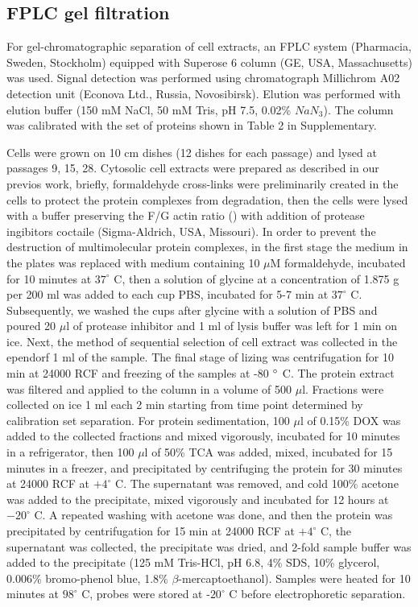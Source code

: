 \documentclass[alpha-refs]{wiley-article}
\begin{document}
\subsection{FPLC gel filtration}

For gel-chromatographic separation of cell extracts, an FPLC system (Pharmacia, Sweden, Stockholm) equipped with Superose 6 column (GE, USA, Massachusetts) was used.
Signal detection was performed using chromatograph Millichrom A02 detection unit (Econova Ltd., Russia, Novosibirsk).
Elution was performed with elution buffer (150 mM NaCl, 50 mM Tris, pH 7.5, 0.02\% $NaN_3$).
The column was calibrated with the set of proteins shown in Table 2 in Supplementary.

Cells were grown on 10 cm dishes (12 dishes for each passage) and lysed at passages 9, 15, 28.
Cytosolic cell extracts were prepared as described in our previos work, briefly, formaldehyde cross-links were preliminarily created in the cells to protect the protein complexes from degradation, then the cells were lysed with a buffer preserving the F/G actin ratio (\cite{bobkov2017effect}) with addition of protease ingibitors coctaile (Sigma-Aldrich, USA, Missouri).
In order to prevent the destruction of multimolecular protein complexes, in the first stage the medium in the plates was replaced with medium containing 10 $\mu$M formaldehyde, incubated for 10 minutes at $37^{\circ}$ C, then a solution of glycine at a concentration of 1.875 g per 200 ml was added to each cup PBS, incubated for 5-7 min at  $37^{\circ}$  C.
Subsequently, we washed the cups after glycine with a solution of PBS and poured 20 $\mu$l of protease inhibitor and 1 ml of lysis buffer was left for 1 min on ice.
Next, the method of sequential selection of cell extract was collected in the ependorf 1 ml of the sample.
The final stage of lizing was centrifugation for 10 min at 24000 RCF and freezing of the samples at -80 $\degree$ C.
The protein extract was filtered and applied to the column in a volume of 500 $\mu$l.
Fractions were collected on ice 1 ml each 2 min starting from time point determined by calibration set separation.
For protein sedimentation, 100 $\mu$l of 0.15\% DOX was added to the collected fractions and mixed vigorously, incubated for 10 minutes in a refrigerator, then 100 $\mu$l of 50\% TCA was added, mixed, incubated for 15 minutes in a freezer, and precipitated by centrifuging the protein for 30 minutes at 24000 RCF at $+4^{\circ}$ C.
The supernatant was removed, and cold 100\% acetone was added to the precipitate, mixed vigorously and incubated for 12 hours at $-20^{\circ}$ C.
A repeated washing with acetone was done, and then the protein was precipitated by centrifugation for 15 min at 24000 RCF at $+4^{\circ}$ C, the supernatant was collected, the precipitate was dried, and 2-fold sample buffer was added to the precipitate (125 mM Tris-HCl, pH 6.8, 4\% SDS, 10\% glycerol, 0.006\% bromo-phenol blue, 1.8\% $\beta$-mercaptoethanol).
Samples were heated for 10 minutes at $98^{\circ}$ C, probes were stored at -$20^{\circ}$ C before electrophoretic separation.
\end{document}
